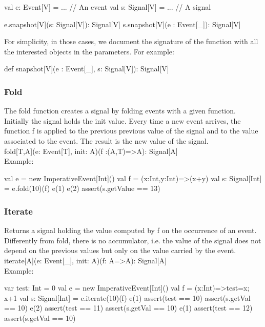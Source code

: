 \documentclass[10pt,a4paper]{article}
\newcommand{\code}[1]{{\fontfamily{cmtt}\small\selectfont#1}}
\begin{document}
\begin{codenv}
val e: Event[V]  = ... // An event
val s: Signal[V] = ... // A signal

e.snapshot[V](s: Signal[V]): Signal[V]
s.snapshot[V](e : Event[_]): Signal[V]
\end{codenv}


For simplicity, in those cases, we document the signature of the
function with all the interested objects in the parameters. For
example:

\begin{codenv}
def snapshot[V](e : Event[_], s: Signal[V]): Signal[V]
\end{codenv}


\subsubsection{Fold}
The \code{fold} function creates a signal by folding events with a
given function. Initially the signal holds the \code{init}
value. Every time a new event arrives, the function \code{f} is
applied to the previous previous value of the signal and to the value
associated to the event. The result is the new value of the signal.
\\

\code{fold[T,A](e: Event[T], init: A)(f :(A,T)=>A): Signal[A]}
\\

\noindent
Example:

\begin{codenv}
val e = new ImperativeEvent[Int]()
val f = (x:Int,y:Int)=>(x+y)
val s: Signal[Int] = e.fold(10)(f)
e(1)
e(2)
assert(s.getValue == 13)
\end{codenv}


\subsubsection{Iterate}
Returns a signal holding the value computed by \code{f} on the
occurrence of an event. Differently from \code{fold}, there is no
accumulator, i.e. the value of the signal does not depend on the
previous values but only on the value carried by the event.
\\

\code{iterate[A](e: Event[\_], init: A)(f: A=>A): Signal[A]}
\\

\noindent
Example:

\begin{codenv}
var test: Int = 0
val e = new ImperativeEvent[Int]()
val f = (x:Int)=>{test=x; x+1}  
val s: Signal[Int] = e.iterate(10)(f)
e(1)
assert(test == 10)
assert(s.getVal == 10)
e(2)
assert(test == 11)
assert(s.getVal == 10)
e(1)
assert(test == 12)
assert(s.getVal == 10)
\end{codenv}
\end{document}
